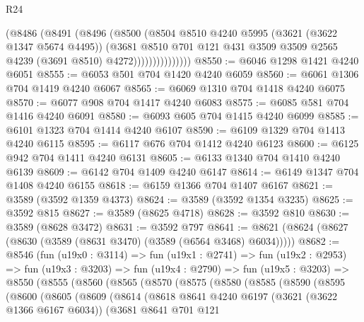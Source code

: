 \begin{lexlean}{R24}
\begin{coremodule}
                      (@8486
                        (@8491
                          (@8496
                            (@8500
                              (@8504
                                @8510
                                @4240
                                @5995
                                (@3621 (@3622 @1347 @5674 @4495))
                                (@3681
                                  @8510
                                  @701
                                  @121
                                  @431
                                  @3509
                                  @3509
                                  @2565
                                  @4239
                                  (@3691 @8510)
                                  @4272)))))))))))))))
@8550 := @6046 @1298 @1421 @4240 @6051
@8555 := @6053 @501 @704 @1420 @4240 @6059
@8560 := @6061 @1306 @704 @1419 @4240 @6067
@8565 := @6069 @1310 @704 @1418 @4240 @6075
@8570 := @6077 @908 @704 @1417 @4240 @6083
@8575 := @6085 @581 @704 @1416 @4240 @6091
@8580 := @6093 @605 @704 @1415 @4240 @6099
@8585 := @6101 @1323 @704 @1414 @4240 @6107
@8590 := @6109 @1329 @704 @1413 @4240 @6115
@8595 := @6117 @676 @704 @1412 @4240 @6123
@8600 := @6125 @942 @704 @1411 @4240 @6131
@8605 := @6133 @1340 @704 @1410 @4240 @6139
@8609 := @6142 @704 @1409 @4240 @6147
@8614 := @6149 @1347 @704 @1408 @4240 @6155
@8618 := @6159 @1366 @704 @1407 @6167
@8621 := @3589 (@3592 @1359 @4373)
@8624 := @3589 (@3592 @1354 @3235)
@8625 := @3592 @815
@8627 := @3589 (@8625 @4718)
@8628 := @3592 @810
@8630 := @3589 (@8628 @3472)
@8631 := @3592 @797
@8641 := @8621 (@8624 (@8627 (@8630 (@3589 (@8631 @3470) (@3589 (@6564 @3468) @6034)))))
@8682 := @8546
    (fun (u19x0 : @3114) =>
    fun (u19x1 : @2741) =>
    fun (u19x2 : @2953) =>
    fun (u19x3 : @3203) =>
    fun (u19x4 : @2790) =>
    fun (u19x5 : @3203) =>
    @8550
      (@8555
        (@8560
          (@8565
            (@8570
              (@8575
                (@8580
                  (@8585
                    (@8590
                      (@8595
                        (@8600
                          (@8605
                            (@8609
                              (@8614
                                (@8618
                                  @8641
                                  @4240
                                  @6197
                                  (@3621 (@3622 @1366 @6167 @6034))
                                  (@3681
                                    @8641
                                    @701
                                    @121

\end{coremodule}
\end{lexlean}
